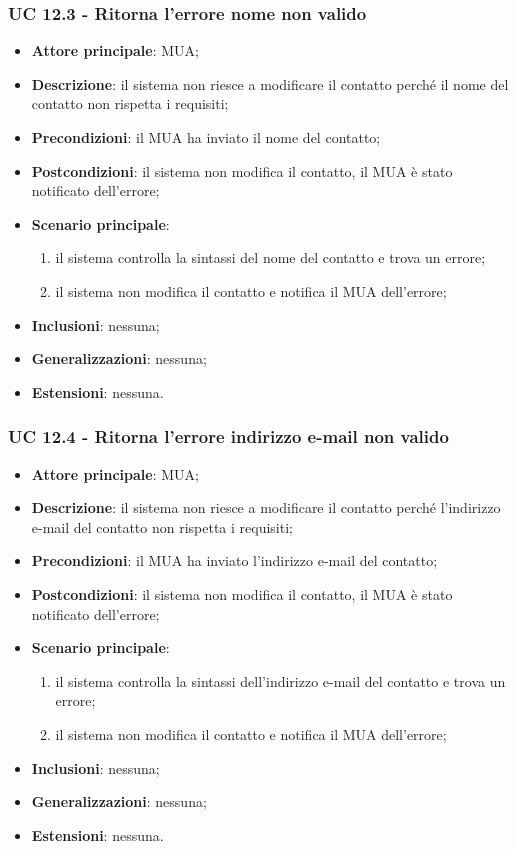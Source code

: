 \subsubsection{UC 12.3 - Ritorna l'errore nome non valido} \label{sec:UC12.3}
    \begin{itemize}
        \item \textbf{Attore principale}: MUA;
        \item \textbf{Descrizione}: il sistema non riesce a modificare il contatto perché il nome del contatto non rispetta i requisiti;
        \item \textbf{Precondizioni}: il MUA ha inviato il nome del contatto;
        \item \textbf{Postcondizioni}: il sistema non modifica il contatto, il MUA è stato notificato dell'errore;
        \item \textbf{Scenario principale}:
            \begin{enumerate}
                \item il sistema controlla la sintassi del nome del contatto e trova un errore;
                \item il sistema non modifica il contatto e notifica il MUA dell'errore;
            \end{enumerate}
        \item \textbf{Inclusioni}: nessuna;
        \item \textbf{Generalizzazioni}: nessuna;
        \item \textbf{Estensioni}: nessuna.
    \end{itemize}

\subsubsection{UC 12.4 - Ritorna l'errore indirizzo e-mail non valido} \label{sec:UC12.4}
    \begin{itemize}
        \item \textbf{Attore principale}: MUA;
        \item \textbf{Descrizione}: il sistema non riesce a modificare il contatto perché l'indirizzo e-mail del contatto non rispetta i requisiti;
        \item \textbf{Precondizioni}: il MUA ha inviato l'indirizzo e-mail del contatto;
        \item \textbf{Postcondizioni}: il sistema non modifica il contatto, il MUA è stato notificato dell'errore;
        \item \textbf{Scenario principale}:
            \begin{enumerate}
                \item il sistema controlla la sintassi dell'indirizzo e-mail del contatto e trova un errore;
                \item il sistema non modifica il contatto e notifica il MUA dell'errore;
            \end{enumerate}
        \item \textbf{Inclusioni}: nessuna;
        \item \textbf{Generalizzazioni}: nessuna;
        \item \textbf{Estensioni}: nessuna.
    \end{itemize}